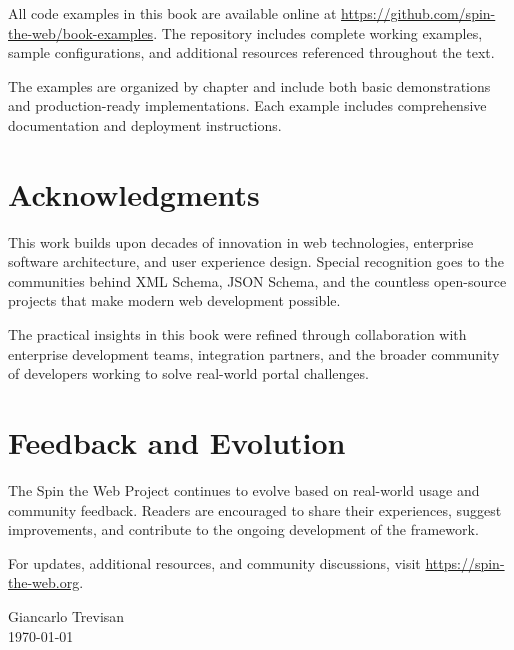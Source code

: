 All code examples in this book are available online at \url{https://github.com/spin-the-web/book-examples}. The repository includes complete working examples, sample configurations, and additional resources referenced throughout the text.

The examples are organized by chapter and include both basic demonstrations and production-ready implementations. Each example includes comprehensive documentation and deployment instructions.

\section*{Acknowledgments}

This work builds upon decades of innovation in web technologies, enterprise software architecture, and user experience design. Special recognition goes to the communities behind XML Schema, JSON Schema, and the countless open-source projects that make modern web development possible.

The practical insights in this book were refined through collaboration with enterprise development teams, integration partners, and the broader community of developers working to solve real-world portal challenges.

\section*{Feedback and Evolution}

The Spin the Web Project continues to evolve based on real-world usage and community feedback. Readers are encouraged to share their experiences, suggest improvements, and contribute to the ongoing development of the framework.

For updates, additional resources, and community discussions, visit \url{https://spin-the-web.org}.

\vspace{1cm}
\hfill Giancarlo Trevisan \\
\hfill \today

\clearpage
